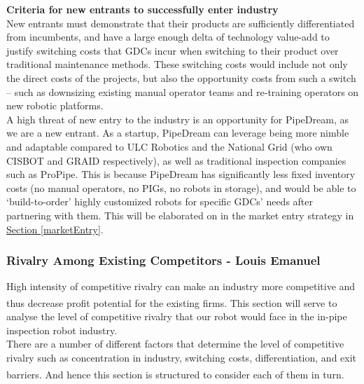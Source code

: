 \documentclass[11pt]{article}		%
\newcommand{\supercite}[1]{\textsuperscript{\cite{#1}}}		%
\newcommand{\sectref}[1]{\hyperref[#1]{Section \ref*{#1}}}     %
\begin{document}
            \textbf{Criteria for new entrants to successfully enter industry}
            \\
            New entrants must demonstrate that their products are sufficiently differentiated from incumbents, and have a large enough delta of technology value-add to justify switching costs that GDCs incur when switching to their product over traditional maintenance methods. These switching costs would include not only the direct costs of the projects, but also the opportunity costs from such a switch – such as downsizing existing manual operator teams and re-training operators on new robotic platforms. 
            \\
            \hspace*{3ex}A high threat of new entry to the industry is an opportunity for PipeDream, as we are a new entrant. As a startup, PipeDream can leverage being more nimble and adaptable compared to ULC Robotics and the National Grid (who own CISBOT and GRAID respectively), as well as traditional inspection companies such as ProPipe. This is because PipeDream has significantly less fixed inventory costs (no manual operators, no PIGs, no robots in storage), and would be able to ‘build-to-order’ highly customized robots for specific GDCs’ needs after partnering with them. This will be elaborated on in the market entry strategy in \sectref{marketEntry}. 
            
            \subsubsection{Rivalry Among Existing Competitors - Louis Emanuel}
		        
		        High intensity of competitive rivalry can make an industry more competitive and thus decrease profit potential for the existing firms\supercite{porter2008five}. This section will serve to analyse the level of competitive rivalry that our robot would face in the in-pipe inspection robot industry.
		        \\
                \hspace*{3ex}There are a number of different factors that determine the level of competitive rivalry such as concentration in industry, switching costs, differentiation, and exit barriers\supercite{rivalryfactorsCI}. And hence this section is structured to consider each of them in turn. 
		        
\end{document}
